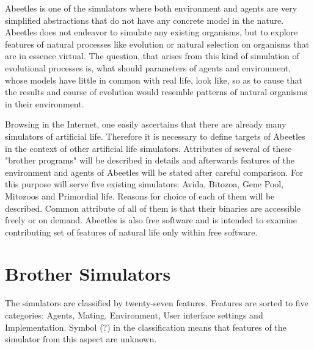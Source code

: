 \documentclass[a4paper,12pt]{report}
\begin{document}
Abeetles is one of the simulators where both environment and agents are very simplified abstractions that do not have any concrete model in the nature. Abeetles does not endeavor to simulate any existing organisms, but to explore features of natural processes like evolution or natural selection on organisms that are in essence virtual. The question, that arises from this kind of simulation of evolutional processes is, what should parameters of agents and environment, whose models have little in common with real life, look like, so as to cause that the results and course of evolution would resemble patterns of natural organisms in their environment.  


Browsing in the Internet, one easily ascertains that there are already many simulators of artificial life. Therefore it is necessary to define targets of Abeetles in the context of other artificial life simulators. Attributes of several of these "brother programs" will be described in details and afterwards features of the environment and agents of Abeetles will be stated after careful comparison. For this purpose will serve five existing simulators: Avida, Bitozoa, Gene Pool, Mitozoos and Primordial life. Reasons for choice of each of them will be described. Common attribute of all of them is that their binaries are accessible freely or on demand. Abeetles is also free software and is intended to examine contributing set of features of natural life only within free software.

\section{Brother Simulators}


The simulators are classified by twenty-seven features. Features are sorted to   
five categories: Agents, Mating, Environment, User interface settings and Implementation. Symbol (?) in the classification means that features of the simulator from this aspect are unknown.
\end{document}

